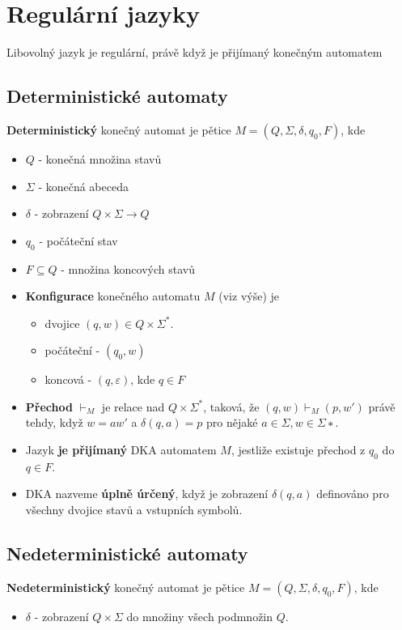\documentclass{szzclass}
\begin{document}
\section{Regulární jazyky}
\begin{theorem}
Libovolný jazyk je regulární, právě když je přijímaný konečným automatem
\end{theorem}

\subsection{Deterministické automaty}
\begin{definition}
\textbf{Deterministický} konečný automat je pětice $M=(Q,\Sigma,\delta,q_0,F)$, kde
\begin{itemize}
\item $Q$ - konečná množina stavů
\item $\Sigma$ - konečná abeceda
\item $\delta$ - zobrazení $Q\times\Sigma \to Q$
\item $q_0$ - počáteční stav
\item $F\subseteq Q$ - množina koncových stavů
\end{itemize}
\end{definition}

\begin{itemize}
\item \textbf{Konfigurace} konečného automatu $M$ (viz výše) je
  \begin{itemize}
  \item dvojice $(q,w)\in Q\times \Sigma^{*}$.
  \item počáteční - $(q_0,w)$
  \item koncová - $(q,\varepsilon)$, kde $q\in F$
  \end{itemize}
\item \textbf{Přechod} $\vdash_M$ je relace nad $Q\times\Sigma^{*}$, taková, že $(q, w) \vdash_M (p, w')$ právě tehdy, když $w = aw'$ a $\delta(q, a) = p$ pro nějaké $a\in\Sigma,w \in \Sigma{∗}.$
\item Jazyk \textbf{je přijímaný} DKA automatem $M$, jestliže existuje přechod z $q_0$ do $q\in F$.
\item DKA nazveme \textbf{úplně úrčený}, když je zobrazení $\delta(q,a)$ definováno pro všechny dvojice stavů a vstupních symbolů.
\end{itemize}

\subsection{Nedeterministické automaty}
\begin{definition}
\textbf{Nedeterministický} konečný automat je pětice $M=(Q,\Sigma,\delta,q_0,F)$, kde
\begin{itemize}
\item $\delta$ - zobrazení $Q\times\Sigma$ do množiny všech podmnožin $Q$.
\end{itemize}
\end{definition}
\end{document}
